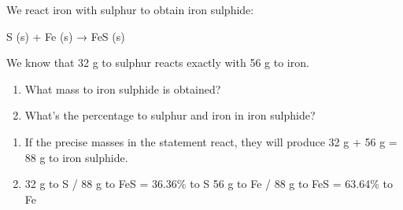 \begin{exercise}
    We react iron with sulphur to obtain iron sulphide:
    \begin{reaction*}
        S (s) + Fe (s) → FeS (s)
    \end{reaction*}
    We know that 32 g to sulphur reacts exactly with
    56 g to iron.
    \begin{enumerate}[label=\letraminuscula]
            \item What mass to iron sulphide is obtained?
            \item What's the percentage to sulphur and iron in
            iron sulphide?
    \end{enumerate}
    \begin{solu}
        \begin{enumerate}[label=\letraminuscula]
                \item If the precise masses in the statement react,
                they will produce 32 g + 56 g = 88 g to iron
                sulphide.
                \item 32 g to S / 88 g to FeS = 36.36\% to S
                56 g to Fe / 88 g to FeS = 63.64\% to Fe
        \end{enumerate}
    \end{solu}
\end{exercise}

